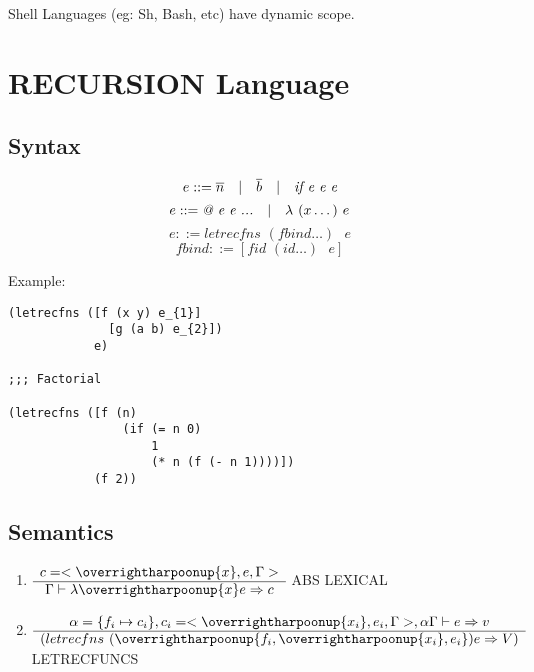 Shell Languages (eg: Sh, Bash, etc) have dynamic scope.

\section{RECURSION Language}
\subsection{Syntax}
$$
e ::= \overline{n} \quad | \quad \overline{b} \quad | \quad \textit{if e e e} \\
$$
$$
e ::= \textit{@ e e ...} \quad | \quad \lambda \textit{ } (x \dots) \textit{ } e \\
$$
$$
e ::= \textit{letrecfns } (fbind \dots) \textit{ } e 
$$
$$
fbind ::= [\textit{fid } (id \dots) \textit{ } e]
$$

Example:
\begin{verbatim}
(letrecfns ([f (x y) e_{1}]
              [g (a b) e_{2}])
            e)

;;; Factorial

(letrecfns ([f (n) 
                (if (= n 0)
                    1
                    (* n (f (- n 1))))])
            (f 2))
\end{verbatim}

\subsection{Semantics}

\begin{enumerate}
\item $\bigfrac{c = <\overrightharpoonup{x}, e, \Gamma>}{\Gamma \vdash \lambda \overrightharpoonup{x} e \Rightarrow c}$ ABS LEXICAL
\item $\bigfrac{\alpha = \{f_{i} \mapsto c_{i}\}, c_{i} = <\overrightharpoonup{x_{i}}, e_{i}, \Gamma>, \alpha\Gamma \vdash e \Rightarrow v}{(letrecfns \textit{ }(\overrightharpoonup{f_{i}, \overrightharpoonup{x_{i}}, e_{i}}) e \Rightarrow V)}$ LETRECFUNCS
\end{enumerate}

